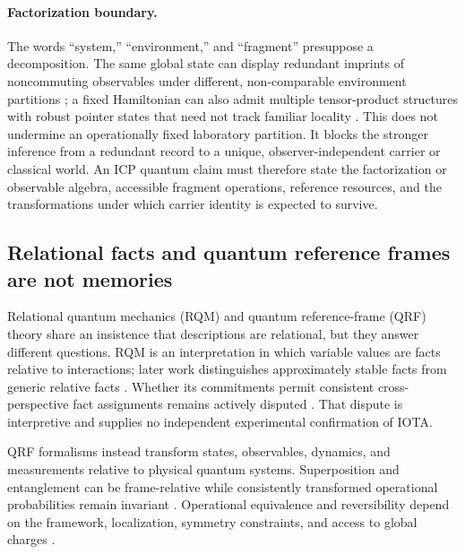 \paragraph{Factorization boundary.}
The words ``system,'' ``environment,'' and ``fragment'' presuppose a
decomposition.  The same global state can display redundant imprints of
noncommuting observables under different, non-comparable environment
partitions \citep{Fu2021RedundantImprints}; a fixed Hamiltonian can also admit
multiple tensor-product structures with robust pointer states that need not
track familiar locality \citep{AdilEtAl2026ClassicalSubsystems}.  This does not
undermine an operationally fixed laboratory partition.  It blocks the stronger
inference from a redundant record to a unique, observer-independent carrier or
classical world.  An ICP quantum claim must therefore state the factorization
or observable algebra, accessible fragment operations, reference resources,
and the transformations under which carrier identity is expected to survive.

\subsection{Relational facts and quantum reference frames are not memories}

Relational quantum mechanics (RQM) and quantum reference-frame (QRF) theory
share an insistence that descriptions are relational, but they answer different
questions.  RQM is an interpretation in which variable values are facts
relative to interactions; later work distinguishes approximately stable facts
from generic relative facts \citep{Rovelli1996RelationalQuantum,
DiBiagioRovelli2021StableFacts}.  Whether its commitments permit consistent
cross-perspective fact assignments remains actively disputed
\citep{Pienaar2021Quandaries,DiBiagioRovelli2022Reply}.  That dispute is
interpretive and supplies no independent experimental confirmation of IOTA.

QRF formalisms instead transform states, observables, dynamics, and
measurements relative to physical quantum systems.  Superposition and
entanglement can be frame-relative while consistently transformed operational
probabilities remain invariant \citep{GiacominiEtAl2019QuantumFrames}.  Operational
equivalence and reversibility depend on the framework, localization, symmetry
constraints, and access to global charges
\citep{CaretteEtAl2025OperationalFrames,DoatVanrietvelde2026Charge}.

